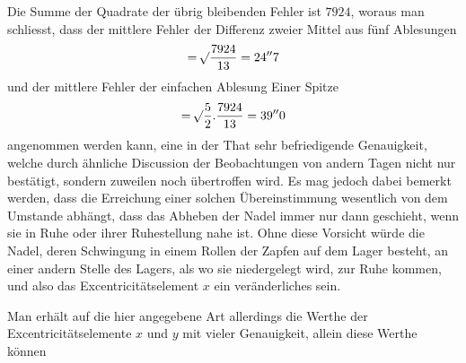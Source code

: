 Die Summe der Quadrate der übrig bleibenden Fehler ist $7924$, woraus man schliesst, dass der mittlere Fehler der Differenz zweier Mittel aus fünf Ablesungen
\[
=\mathord{{}^{}\!\surd}\frac{7924}{13}=24''7
\]
und der mittlere Fehler der einfachen Ablesung Einer Spitze
\[
=\mathord{{}^{}\!\surd}\frac{5}{2}.\frac{7924}{13}=39''0
\]
angenommen werden kann, eine in der That sehr befriedigende Genauigkeit, welche durch ähnliche Discussion der Beobachtungen von andern Tagen nicht nur bestätigt, sondern zuweilen noch übertroffen wird. Es mag jedoch dabei bemerkt werden, dass die Erreichung einer solchen Übereinstimmung wesentlich von dem Umstande abhängt, dass das Abheben der Nadel immer nur dann geschieht, wenn sie in Ruhe oder ihrer Ruhestellung nahe ist. Ohne diese Vorsicht würde die Nadel, deren Schwingung in einem Rollen der Zapfen auf dem Lager besteht, an einer andern Stelle des Lagers, als wo sie niedergelegt wird, zur Ruhe kommen, und also das Excentricitätselement $x$ ein veränderliches sein.

Man erhält auf die hier angegebene Art allerdings die Werthe der Excentricitätselemente $x$ und $y$ mit vieler Genauigkeit, allein diese Werthe können
